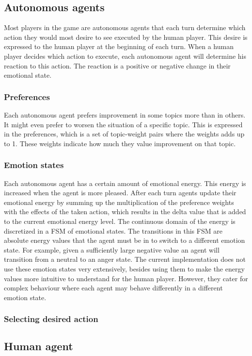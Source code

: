 \documentclass[11pt,a4paper]{article}
\begin{document}
  \subsection{Autonomous agents}
    Most players in the game are autonomous agents that each turn determine which action they would most desire to see executed by the human player. This desire is expressed to the human player at the beginning of each turn. When a human player decides which action to execute, each autonomous agent will determine his reaction to this action. The reaction is a positive or negative change in their emotional state.
    \subsubsection{Preferences}
      Each autonomous agent prefers improvement in some topics more than in others. It might even prefer to worsen the situation of a specific topic. This is expressed in the preferences, which is a set of topic-weight pairs where the weights adds up to 1. These weights indicate how much they value improvement on that topic.
    \subsubsection{Emotion states}
      Each autonomous agent has a certain amount of emotional energy. This energy is increased when the agent is more pleased. After each turn agents update their emotional energy by summing up the multiplication of the preference weights with the effects of the taken action, which results in the delta value that is added to the current emotional energy level. The continuous domain of the energy is discretized in a FSM of emotional states. The transitions in this FSM are absolute energy values that the agent must be in to switch to a different emotion state. For example, given a sufficiently large negative value an agent will transition from a neutral to an anger state. The current implementation does not use these emotion states very extensively, besides using them to make the energy values more intuitive to understand for the human player. However, they cater for complex behaviour where each agent may behave differently in a different emotion state.
    \subsubsection{Selecting desired action}
  \subsection{Human agent}
\end{document}
